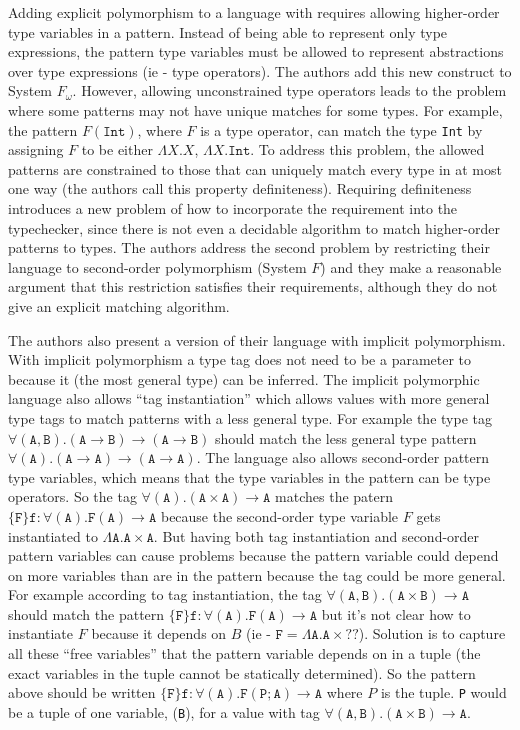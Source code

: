 \documentclass[12pt]{article}	%
\begin{document}
Adding explicit polymorphism to a language with \Dynamic requires allowing higher-order type variables in a \typecase pattern. Instead of being able to represent only type expressions, the pattern type variables must be allowed to represent abstractions over type expressions (ie - type operators). The authors add this new \typecase construct to System $F_\omega$. However, allowing unconstrained type operators leads to the problem where some \typecase patterns may not have unique matches for some types. For example, the pattern $F(\mathtt{Int})$, where $F$ is a type operator, can match the type \texttt{Int} by assigning $F$ to be either $\Lambda X.X$, $\Lambda X.\mathtt{Int}$. To address this problem, the allowed patterns are constrained to those that can uniquely match every type in at most one way (the authors call this property definiteness). Requiring definiteness introduces a new problem of how to incorporate the requirement into the typechecker, since there is not even a decidable algorithm to match higher-order patterns to types. The authors address the second problem by restricting their language to second-order polymorphism (System $F$) and they make a reasonable argument that this restriction satisfies their requirements, although they do not give an explicit matching algorithm.

The authors also present a version of their language with implicit polymorphism. With implicit polymorphism a type tag does not need to be a parameter to \dynamic because it (the most general type) can be inferred. The implicit polymorphic language also allows ``tag instantiation'' which allows \Dynamic values with more general type tags to match patterns with a less general type. For example the type tag $\mathtt{\forall (A,B).(A \rightarrow B)\rightarrow (A \rightarrow B)}$ should match the less general type pattern $\mathtt{\forall (A).(A \rightarrow A)\rightarrow (A \rightarrow A)}$. The language also allows second-order pattern type variables, which means that the type variables in the pattern can be type operators. So the tag $\mathtt{\forall(A).(A\times A)\rightarrow A}$ matches the patern $\mathtt{\{F\}f:\forall (A).F(A)\rightarrow A}$ because the second-order type variable $F$ gets instantiated to $\mathtt{\Lambda A.A\times A}$. But having both tag instantiation and second-order pattern variables can cause problems because the pattern variable could depend on more variables than are in the pattern because the tag could be more general. For example according to tag instantiation, the tag $\mathtt{\forall(A,B).(A\times B)\rightarrow A}$ should match the pattern $\mathtt{\{F\}f:\forall (A).F(A)\rightarrow A}$ but it's not clear how to instantiate $F$ because it depends on $B$ (ie - $\mathtt{F = \Lambda A.A\times ??}$). Solution is to capture all these ``free variables'' that the pattern variable depends on in a tuple (the exact variables in the tuple cannot be statically determined). So the pattern above should be written $\mathtt{\{F\}f:\forall (A).F(P;A)\rightarrow A}$ where $P$ is the tuple. \texttt{P} would be a tuple of one variable, (\texttt{B}), for a \Dynamic value with tag $\mathtt{\forall(A,B).(A\times B)\rightarrow A}$.
\end{document}
